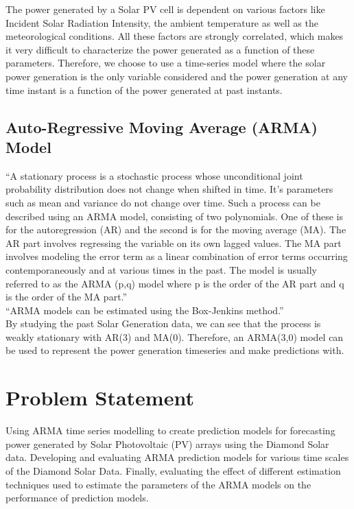 \documentclass[journal]{IEEEtran}
\begin{document}
The power generated by a Solar PV cell is dependent on various factors like Incident Solar Radiation Intensity, the ambient temperature as well as the meteorological conditions. All these factors are strongly correlated, which makes it very difficult to characterize the power generated as a function of these parameters. Therefore, we choose to use a time-series model where the solar power generation is the only variable considered and the power generation at any time instant is a function of the power generated at past instants.

\subsection{Auto-Regressive Moving Average (ARMA) Model}

“A stationary process is a stochastic process whose unconditional joint probability distribution does not change when shifted in time. It’s parameters such as mean and variance do not change over time. Such a process can be described using an ARMA model, consisting of two polynomials. One of these is for the autoregression (AR) and the second is for the moving average (MA). The AR part involves regressing the variable on its own lagged values. The MA part involves modeling the error term as a linear combination of error terms occurring contemporaneously and at various times in the past. The model is usually referred to as the ARMA (p,q) model where p is the order of the AR part and q is the order of the MA part.”
\\
“ARMA models can be estimated using the Box-Jenkins method.”
\\
By studying the past Solar Generation data, we can see that the process is weakly stationary with AR(3) and MA(0). Therefore, an ARMA(3,0) model can be used to represent the power generation timeseries and make predictions with.

\newpage

\section{Problem Statement}

Using ARMA time series modelling to create prediction models for forecasting power generated by Solar Photovoltaic (PV) arrays using the Diamond Solar data. Developing and evaluating ARMA prediction models for various time scales of the Diamond Solar Data. Finally, evaluating the effect of different estimation techniques used to estimate the parameters of the ARMA models on the performance of prediction models.
\end{document}
